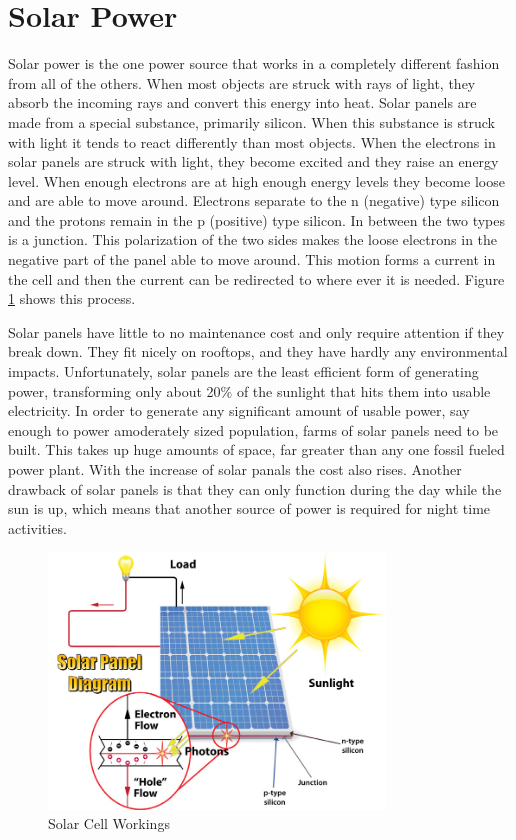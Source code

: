 \documentclass[msc,oneside]{ubcthesis}%
\begin{document}
\newpage

\section{Solar Power}
Solar power is the one power source that works in a completely different fashion from all of the others. When most objects are struck with rays of light, they absorb the incoming rays and convert this energy into heat. Solar panels are made from a special substance, primarily silicon. When this substance is struck with light it tends to react differently than most objects. When the electrons in solar panels are 
struck with light, they become excited and they raise an energy level. When enough electrons are at high enough energy levels they become loose and are able to move around. Electrons separate to the n (negative) type silicon and the protons remain in the p (positive) type silicon. In between the two types is a junction. This polarization of the two sides makes the loose electrons in the negative part of the panel able to move around. This motion forms a current in the cell and then the current can be redirected to where ever it is needed. Figure 
\ref{solarCell} shows this process. 

Solar panels have little to no maintenance cost and only require attention if they break down. They fit nicely on rooftops, and they have hardly any 
environmental impacts. Unfortunately, solar panels are the least efficient form of generating power, transforming  only about 20\% of the sunlight that hits them into usable electricity. In order to generate any significant amount of usable power, say enough to power amoderately sized population, farms of solar panels need to be built. This takes up huge amounts of space, far greater than any one fossil fueled power plant. With the increase of solar panals the cost also rises. Another drawback of solar panels is that they can only function during the day while the sun is up, which means that another source of power is required for night time activities. 

\begin{figure}[hbt]\label{solarCell}
  \begin{center}
    \includegraphics[width=0.8\textwidth]{Solar2}
    \caption[Solar Cell Workings]{ Solar Cell Workings \cite{Solar}}
  \end{center}
\end{figure}
\end{document}
